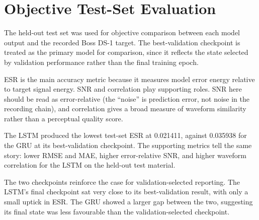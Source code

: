 \section{Objective Test-Set Evaluation}
\label{sec:objective-test-set-evaluation}

The held-out test set was used for objective comparison between each model output and the recorded Boss DS-1 target. The best-validation checkpoint is treated as the primary model for comparison, since it reflects the state selected by validation performance rather than the final training epoch.

ESR is the main accuracy metric because it measures model error energy relative to target signal energy. SNR and correlation play supporting roles. SNR here should be read as error-relative (the ``noise'' is prediction error, not noise in the recording chain), and correlation gives a broad measure of waveform similarity rather than a perceptual quality score.

\begin{table}[htbp]
  \centering
  \caption{Objective test-set metrics}
  \label{tab:objective-test-set-metrics}
\end{table}

The LSTM produced the lowest test-set ESR at 0.021411, against 0.035938 for the GRU at its best-validation checkpoint. The supporting metrics tell the same story: lower RMSE and MAE, higher error-relative SNR, and higher waveform correlation for the LSTM on the held-out test material.

The two checkpoints reinforce the case for validation-selected reporting. The LSTM's final checkpoint sat very close to its best-validation result, with only a small uptick in ESR. The GRU showed a larger gap between the two, suggesting its final state was less favourable than the validation-selected checkpoint.


